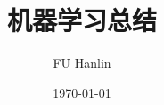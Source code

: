 \documentclass[a4paper,12pt]{book}
\begin{document}
\author{FU Hanlin}
\title{机器学习总结}
\date{\today}

\frontmatter
\maketitle
\tableofcontents

\mainmatter



\backmatter
\end{document}
